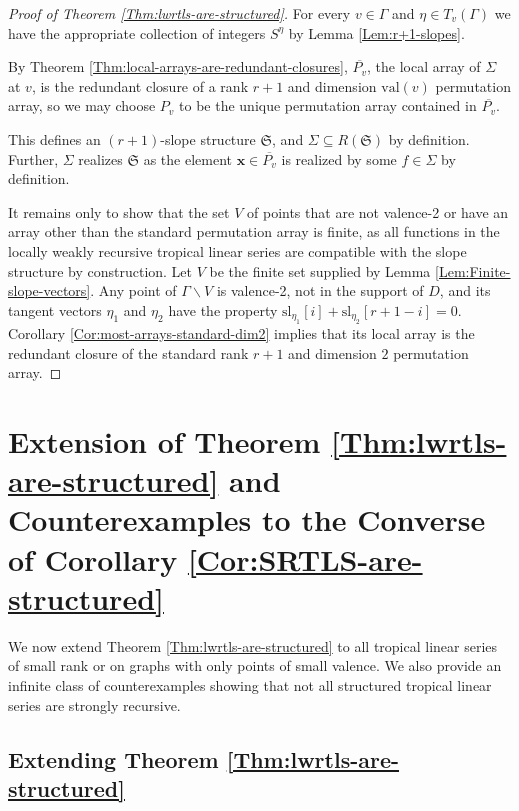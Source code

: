 \documentclass{amsart}
\begin{document}
	\begin{proof}[Proof of Theorem \ref{Thm:lwrtls-are-structured}]
		For every $v \in \Gamma$ and $\eta \in T_v(\Gamma)$ we have the appropriate collection of integers $S^{\eta}$ by Lemma \ref{Lem:r+1-slopes}. 
		
		By Theorem \ref{Thm:local-arrays-are-redundant-closures}, $\overline{P_v}$, the local array of $\Sigma$ at $v$, is the redundant closure of a rank $r+1$ and dimension $\mathrm{val}(v)$ permutation array, so we may choose $P_v$ to be the unique permutation array contained in $\overline{P_v}$.
		
		This defines an $(r+1)$-slope structure $\mathfrak{S}$, and $\Sigma \subseteq R(\mathfrak{S})$ by definition. Further, $\Sigma$ realizes $\mathfrak{S}$ as the element $\mathbf{x} \in \overline{P_v}$ is realized by some $f \in \Sigma$ by definition. 
		
		It remains only to show that the set $V$ of points that are not valence-2 or have an array other than the standard permutation array is finite, as all functions in the locally weakly recursive tropical linear series are compatible with the slope structure by construction. Let $V$ be the finite set supplied by Lemma \ref{Lem:Finite-slope-vectors}. Any point of $\Gamma \backslash V$ is valence-2, not in the support of $D$, and its tangent vectors $\eta_1$ and $\eta_2$ have the property $\mathrm{sl}_{\eta_1}[i] + \mathrm{sl}_{\eta_2}[r+1-i] = 0$. Corollary \ref{Cor:most-arrays-standard-dim2} implies that its local array is the redundant closure of the standard rank $r+1$ and dimension $2$ permutation array.
	\end{proof}
	
	\section{Extension of Theorem \ref{Thm:lwrtls-are-structured} and Counterexamples to the Converse of Corollary \ref{Cor:SRTLS-are-structured}}
	\label{Sec:extension-and-counterexample}
	
	We now extend Theorem \ref{Thm:lwrtls-are-structured} to all tropical linear series of small rank or on graphs with only points of small valence. We also provide an infinite class of counterexamples showing that not all structured tropical linear series are strongly recursive.
	
	\subsection{Extending Theorem \ref{Thm:lwrtls-are-structured}} 
	\label{Subsec:result-extension}
	
\end{document}
